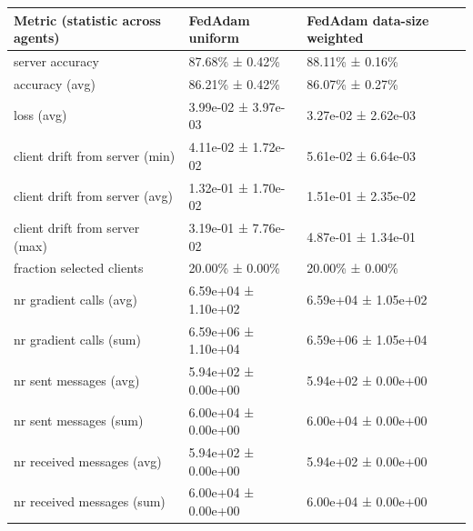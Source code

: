 \begin{tabular}{lll}
\hline
 Metric (statistic across agents)   & FedAdam uniform     & FedAdam data-size weighted   \\
\hline
 server accuracy                    & 87.68\% ± 0.42\%      & 88.11\% ± 0.16\%               \\
 accuracy (avg)                     & 86.21\% ± 0.42\%      & 86.07\% ± 0.27\%               \\
 loss (avg)                         & 3.99e-02 ± 3.97e-03 & 3.27e-02 ± 2.62e-03          \\
 client drift from server (min)     & 4.11e-02 ± 1.72e-02 & 5.61e-02 ± 6.64e-03          \\
 client drift from server (avg)     & 1.32e-01 ± 1.70e-02 & 1.51e-01 ± 2.35e-02          \\
 client drift from server (max)     & 3.19e-01 ± 7.76e-02 & 4.87e-01 ± 1.34e-01          \\
 fraction selected clients          & 20.00\% ± 0.00\%      & 20.00\% ± 0.00\%               \\
 nr gradient calls (avg)            & 6.59e+04 ± 1.10e+02 & 6.59e+04 ± 1.05e+02          \\
 nr gradient calls (sum)            & 6.59e+06 ± 1.10e+04 & 6.59e+06 ± 1.05e+04          \\
 nr sent messages (avg)             & 5.94e+02 ± 0.00e+00 & 5.94e+02 ± 0.00e+00          \\
 nr sent messages (sum)             & 6.00e+04 ± 0.00e+00 & 6.00e+04 ± 0.00e+00          \\
 nr received messages (avg)         & 5.94e+02 ± 0.00e+00 & 5.94e+02 ± 0.00e+00          \\
 nr received messages (sum)         & 6.00e+04 ± 0.00e+00 & 6.00e+04 ± 0.00e+00          \\
\hline
\end{tabular}